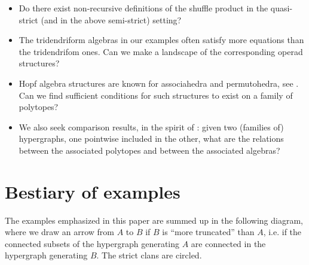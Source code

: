 \documentclass[11pt]{article}
\theoremstyle{definition}
\numberwithin{equation}{section}
\numberwithin{equation}{section}
\newcommand{\hyper}[1]{{\bf #1}}
\begin{document}
\begin{itemize}
\item Do there exist  non-recursive definitions of the shuffle product in the quasi-strict (and in the above  semi-strict) setting?

\item The tridendriform algebras in our examples often satisfy more equations than the tridendrifom ones. Can we make a landscape of the corresponding operad structures?
 
\item Hopf algebra structures are known for associahedra and permutohedra, see \cite{BR,LR-planar-Hopf}. Can we find sufficient conditions for such structures to exist on a family of polytopes?

\item We also seek comparison results, in the spirit of \cite{LR-planar-Hopf,PalaciosRonco}: given two (families of)  hypergraphs, one pointwise included in the other, what are the relations between the associated polytopes  and between the associated algebras?
\end{itemize}

\section*{Bestiary of examples}
The examples emphasized in this paper are summed up in the following diagram, where we draw an arrow from $A$ to $B$ if $B$ is ``more truncated'' than $A$, i.e. if the connected subsets of the hypergraph  generating $A$ are connected in the hypergraph generating $B$.
The strict clans are circled.

\begin{center}
\end{center}
\end{document}
